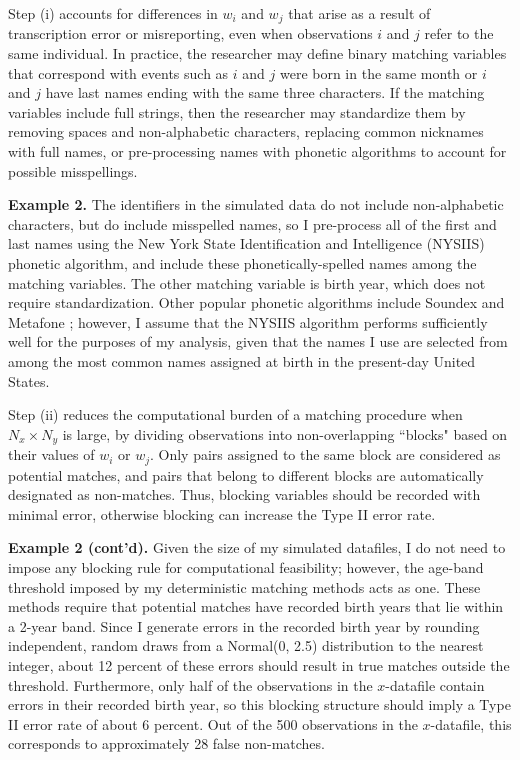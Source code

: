 \documentclass[12pt]{article}
\begin{document}
Step (i) accounts for differences in $w_i$ and $w_j$ that arise as a result of transcription error or misreporting, even when observations $i$ and $j$ refer to the same individual.   In practice, the researcher may define binary matching variables that correspond with events such as $i$ and $j$ were born in the same month or $i$ and $j$ have last names ending with the same three characters.  If the matching variables include full strings, then the researcher may standardize them by removing spaces and non-alphabetic characters, replacing common nicknames with full names, or pre-processing names with phonetic algorithms to account for possible misspellings.

\addlinespace
\textbf{Example 2.}  The identifiers in the simulated data do not include non-alphabetic characters, but do include misspelled names, so I pre-process all of the first and last names using the New York State Identification and Intelligence (NYSIIS) phonetic algorithm, and include these phonetically-spelled names among the matching variables.  The other matching variable is birth year, which does not require standardization.   Other popular phonetic algorithms include Soundex \citep*{soundex} and Metafone \citep*{philips90}; however, I assume that the NYSIIS algorithm performs sufficiently well for the purposes of my analysis, given that the names I use are selected from among the most common names assigned at birth in the present-day United States.  
\addlinespace

Step (ii) reduces the computational burden of a matching procedure when $N_x \times N_y$ is large, by dividing observations into non-overlapping ``blocks" based on their values of $w_i$ or $w_j$.  Only pairs assigned to the same block are considered as potential matches, and pairs that belong to different blocks are automatically designated as non-matches.  Thus, blocking variables should be recorded with minimal error, otherwise blocking can increase the Type II error rate. 

\addlinespace
\textbf{Example 2 (cont'd).} Given the size of my simulated datafiles, I do not need to impose any blocking rule for computational feasibility; however, the age-band threshold imposed by my deterministic matching methods acts as one.  These methods require that potential matches have recorded birth years that lie within a 2-year band.  Since I generate errors in the recorded birth year by rounding independent, random draws from a Normal(0, 2.5) distribution to the nearest integer, about 12 percent of these errors should result in true matches outside the threshold.  Furthermore, only half of the observations in the $x$-datafile contain errors in their recorded birth year, so this blocking structure should imply a Type II error rate of about 6 percent.  Out of the 500 observations in the $x$-datafile, this corresponds to approximately 28 false non-matches. 
\addlinespace
\end{document}

